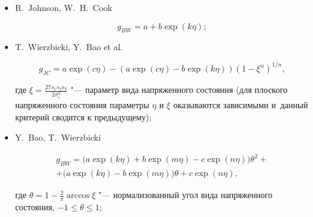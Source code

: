 \begin{itemize}
\begin{equation}

	g_{RT}=\zeta\exp\Bigl(\frac{3}{2}\eta\Bigr),

\end{equation}

где $\zeta=0.283$ в рамках пластичности Мизеса, а $\zeta=0.376$ в рамках пластичности Треска.



\item[--]

R.~Johnson, W.~H.~Cook 

 \cite{keller:bib:john}

\begin{equation}

	g_{BW}=a+b\exp\left(k\eta\right);

\end{equation}



\item[--]

T.~Wierzbicki, Y.~Bao et al.  \cite{keller:bib:triax1} 

\begin{equation}

	g_{JC}=a\exp\left(c\eta\right)-\left(a\exp\left(c\eta\right)-

	b\exp\left(k\eta\right)\right)\left(1-\xi^{n}\right)^{1/{n}},

\end{equation} 

где $\xi=\frac{27 s_1s_2s_3}{2\sigma_i^3}$ "--- параметр вида напряженного состояния (для плоского напряженного состояния параметры $\eta$ и $\xi$ оказываются зависимыми и~данный критерий сводится к предыдущему);



\item[--]

Y.~Bao, T.~Wierzbicki \cite{keller:bib:triax2} 

\begin{multline}

	g_{BW}=\bigl(a\exp (k\eta )+b\exp (m\eta )-c\exp (n\eta)\bigr)\theta^2+\\

	+\bigl(a\exp (k\eta )-b\exp (m\eta )\bigr)\theta+c\exp (n\eta ), 

\end{multline}

где $\theta=1-\frac{2}{\pi}\arccos\xi$ "--- нормализованный угол вида напряженного состояния, $-1\leq\theta\leq 1;$




\end{itemize}
